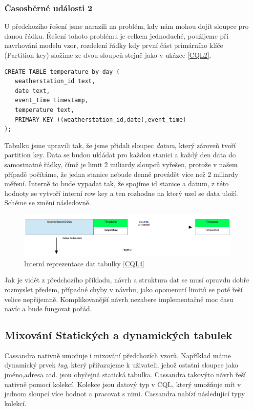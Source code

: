 \subsubsection*{Časosběrné události 2}
U předchozího řešení jsme narazili na problém, kdy nám mohou dojít sloupce pro danou řádku. Řešení tohoto problému je celkem jednoduché, použijeme při navrhování modelu vzor, rozdelení řádky kdy první část primárního klíče (Partition key) složíme ze dvou sloupců stejně jako v ukázce \ref{CQL2}.


\begin{lstlisting}[caption={Dynamická tabulka 2},label=CQL4]
CREATE TABLE temperature_by_day (
   weatherstation_id text,
   date text,
   event_time timestamp,
   temperature text,
   PRIMARY KEY ((weatherstation_id,date),event_time)
);
\end{lstlisting}

Tabulku jsme upravili tak, že jsme přidali sloupec \emph{datum}, který zároveň tvoří partition key. Data se budou ukládat pro každou stanici a každý den data do samostnatné řádky, čímž je limit 2 miliardy sloupců vyřešen, protože v našem případě počítáme, že jedna stanice nebude denně provádět více než 2 miliardy měření. Interně to bude vypadat tak, že spojíme id stanice a datum, z této hodnoty se vytvoří interní row key a ten rozhodne na který uzel se data uloží. Schéme se změní následovně. 

\begin{figure}[h]
\centering
\includegraphics[scale=0.4]{images/timeseries2}
\caption{Interní reprezentace dat tabulky \ref{CQL4}}
\label{fig:timeseries1}
\end{figure}

Jak je vidět z předchozího příkladu, návrh a struktura dat se musí opravdu dobře rozmyslet předem, případné chyby v návrhu, jako opomenutí limitů se poté řeší velice nepřijemně. Komplikovanější návrh nezabere implementačně moc času navíc a bude fungovat pořád.


\subsection{Mixování Statických a dynamických tabulek}
Cassandra nativně umoňuje i mixování předchozích vzorů. Například máme dynamický prvek \emph{tag}, který přiřazujeme k uživateli, jehož ostatní sloupce jako jméno,adresa atd. jsou obyčejná statická tabulka. Cassandra takovýto návrh řeší nativně pomocí kolekcí. Kolekce jsou datový typ v CQL, který umožňuje mít v jednom sloupcí více hodnot a pracovat s nimi. Cassandra nabízí následující typy kolekcí.

